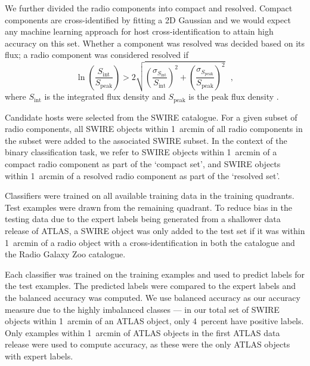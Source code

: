 \documentclass[fleqn,usenatbib,usedcolumn]{mnras}
\begin{document}
    We further divided the radio components into compact and resolved. Compact
    components are cross-identified by fitting a 2D Gaussian \citep[as
    in][]{norris06} and we would expect any machine learning approach for host
    cross-identification to attain high accuracy on this set. Whether a
    component was resolved was decided based on its flux; a radio component was
    considered resolved if
    \begin{equation}
        \ln \left(
          \frac{S_{\text{int}}}
               {S_{\text{peak}}}
        \right) > 2\sqrt{\left(
          \frac{\sigma_{S_{\text{int}}}}
               {S_{\text{int}}}
        \right)^2 + \left(
          \frac{\sigma_{S_{\text{peak}}}}
               {S_{\text{peak}}}
        \right)^2}\,\,\,\,,
    \end{equation}%
    where \(S_{\text{int}}\) is the integrated flux density and
    \(S_{\text{peak}}\) is the peak flux density \citep{franzen15}.

    Candidate hosts were selected from the SWIRE catalogue. For a given subset
    of radio components, all SWIRE objects within 1~arcmin of all radio
    components in the subset were added to the associated SWIRE subset. In the
    context of the binary classification task, we refer to SWIRE objects
    within 1~arcmin of a compact radio component as part of the `compact set',
    and SWIRE objects within 1~arcmin of a resolved radio component as part of
    the `resolved set'.

    Classifiers were trained on all available training data in the training
    quadrants. Test examples were drawn from the remaining quadrant. To reduce
    bias in the testing data due to the expert labels being generated from a
    shallower data release of ATLAS, a SWIRE object was only added to the test
    set if it was within 1~arcmin of a radio object with a cross-identification
    in both the \citet{norris06} catalogue and the Radio Galaxy Zoo catalogue.

    Each classifier was trained on the training examples and used to predict
    labels for the test examples. The predicted labels were compared to the
    expert labels and the balanced accuracy was computed. We use balanced
    accuracy as our accuracy measure due to the highly imbalanced classes --- in
    our total set of SWIRE objects within 1~arcmin of an ATLAS object, only
    4~percent have positive labels. Only examples within 1~arcmin of ATLAS
    objects in the first ATLAS data release \citep{norris06} were used to
    compute accuracy, as these were the only ATLAS objects with expert labels.
\end{document}
